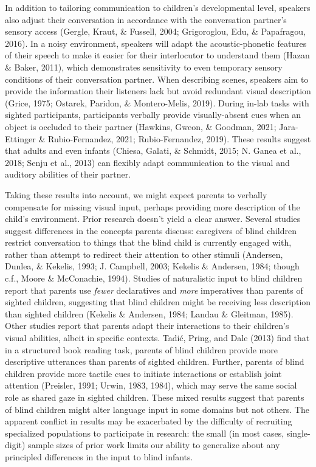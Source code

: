 \documentclass[
  man]{apa6}
\begin{document}
In addition to tailoring communication to children's developmental level, speakers also adjust their conversation in accordance with the conversation partner's sensory access (Gergle, Kraut, \& Fussell, 2004; Grigoroglou, Edu, \& Papafragou, 2016). In a noisy environment, speakers will adapt the acoustic-phonetic features of their speech to make it easier for their interlocutor to understand them (Hazan \& Baker, 2011), which demonstrates sensitivity to even temporary sensory conditions of their conversation partner. When describing scenes, speakers aim to provide the information their listeners lack but avoid redundant visual description (Grice, 1975; Ostarek, Paridon, \& Montero-Melis, 2019). During in-lab tasks with sighted participants, participants verbally provide visually-absent cues when an object is occluded to their partner (Hawkins, Gweon, \& Goodman, 2021; Jara-Ettinger \& Rubio-Fernandez, 2021; Rubio-Fernandez, 2019). These results suggest that adults and even infants (Chiesa, Galati, \& Schmidt, 2015; N. Ganea et al., 2018; Senju et al., 2013) can flexibly adapt communication to the visual and auditory abilities of their partner.

Taking these results into account, we might expect parents to verbally compensate for missing visual input, perhaps providing more description of the child's environment. Prior research doesn't yield a clear answer. Several studies suggest differences in the concepts parents discuss: caregivers of blind children restrict conversation to things that the blind child is currently engaged with, rather than attempt to redirect their attention to other stimuli (Andersen, Dunlea, \& Kekelis, 1993; J. Campbell, 2003; Kekelis \& Andersen, 1984; though c.f., Moore \& McConachie, 1994). Studies of naturalistic input to blind children report that parents use \emph{fewer} declaratives and \emph{more} imperatives than parents of sighted children, suggesting that blind children might be receiving less description than sighted children (Kekelis \& Andersen, 1984; Landau \& Gleitman, 1985). Other studies report that parents adapt their interactions to their children's visual abilities, albeit in specific contexts. Tadić, Pring, and Dale (2013) find that in a structured book reading task, parents of blind children provide more descriptive utterances than parents of sighted children. Further, parents of blind children provide more tactile cues to initiate interactions or establish joint attention (Preisler, 1991; Urwin, 1983, 1984), which may serve the same social role as shared gaze in sighted children. These mixed results suggest that parents of blind children might alter language input in some domains but not others. The apparent conflict in results may be exacerbated by the difficulty of recruiting specialized populations to participate in research: the small (in most cases, single-digit) sample sizes of prior work limits our ability to generalize about any principled differences in the input to blind infants.
\end{document}
